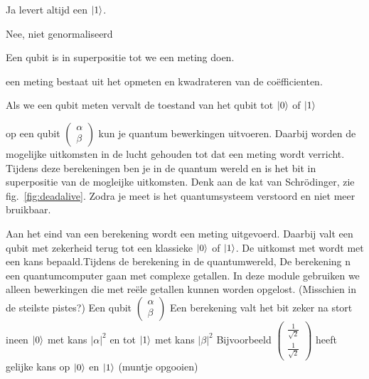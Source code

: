 \documentclass[../../main.tex]{subfiles}
\begin{document}
Ja levert altijd een  $\ket{1}$.

Nee, niet genormaliseerd


Een qubit is in superpositie tot we een meting doen. 

een meting bestaat uit het opmeten en kwadrateren van de co\"efficienten.

Als we een qubit meten vervalt de toestand van het qubit tot $\ket{0}$ of $\ket{1}$


op een qubit $\begin{pmatrix}
\alpha\\
\beta
\end{pmatrix}
$
kun je quantum bewerkingen uitvoeren. Daarbij worden de mogelijke uitkomsten in de lucht gehouden tot dat een meting wordt verricht. Tijdens deze berekeningen ben je in de quantum wereld en is het bit in superpositie van de mogleijke uitkomsten. Denk aan de kat van Schr\"odinger, zie fig.~\ref{fig:deadalive}.
Zodra je meet is het quantumsysteem verstoord en niet meer bruikbaar. 


Aan het eind van een berekening wordt een meting uitgevoerd. Daarbij  valt een qubit met zekerheid terug tot een klassieke $\ket{0}$ of $\ket{1}$. De uitkomst met wordt met een kans bepaald.Tijdens de berekening in de quantumwereld, De berekening n een quantumcomputer gaan met complexe getallen. In deze module gebruiken we alleen bewerkingen die met re\"ele getallen kunnen worden opgelost. (Misschien in de steilste pistes?)
Een qubit $\begin{pmatrix}
\alpha\\
\beta
\end{pmatrix}
$
Een berekening valt het bit zeker na stort ineen $\ket{0}$ met kans $|\alpha|^2$ en tot $\ket{1}$ met kans $|\beta|^2$
Bijvoorbeeld 
$\begin{pmatrix}
\tfrac{1}{\sqrt{2}}\\
\tfrac{1}{\sqrt{2}}
\end{pmatrix}
$
heeft gelijke kans op $\ket{0}$ en $\ket{1}$ (muntje opgooien)
\end{document}
